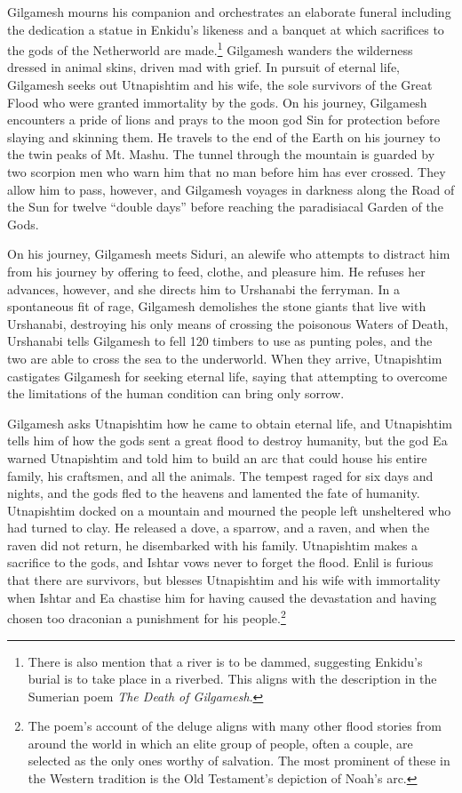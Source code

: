 \documentclass[10pt,a4paper]{article}
\begin{document}
Gilgamesh mourns his companion and orchestrates an elaborate funeral including the dedication a statue in Enkidu’s likeness and a banquet at which sacrifices to the gods of the Netherworld are made.\footnote{There is also mention that a river is to be dammed, suggesting Enkidu’s burial is to take place in a riverbed. This aligns with the description in the Sumerian poem \emph{The Death of Gilgamesh}.} Gilgamesh wanders the wilderness dressed in animal skins, driven mad with grief. In pursuit of eternal life, Gilgamesh seeks out Utnapishtim and his wife, the sole survivors of the Great Flood who were granted immortality by the gods. On his journey, Gilgamesh encounters a pride of lions and prays to the moon god Sin for protection before slaying and skinning them. He travels to the end of the Earth on his journey to the twin peaks of Mt. Mashu. The tunnel through the mountain is guarded by two scorpion men who warn him that no man before him has ever crossed. They allow him to pass, however, and Gilgamesh voyages in darkness along the Road of the Sun for twelve “double days” before reaching the paradisiacal Garden of the Gods. 

On his journey,  Gilgamesh meets Siduri, an alewife who attempts to distract him from his journey by offering to feed, clothe, and pleasure him. He refuses her advances, however, and she directs him to Urshanabi the ferryman. In a spontaneous fit of rage, Gilgamesh demolishes the stone giants that live with Urshanabi, destroying his only means of crossing the poisonous Waters of Death, Urshanabi tells Gilgamesh to fell 120 timbers to use as punting poles, and the two are able to cross the sea to the underworld. When they arrive, Utnapishtim castigates Gilgamesh for seeking eternal life, saying that attempting to overcome the limitations of the human condition can bring only sorrow. 

Gilgamesh asks Utnapishtim how he came to obtain eternal life, and Utnapishtim tells him of how the gods sent a great flood to destroy humanity, but the god Ea warned Utnapishtim and told him to build an arc that could house his entire family, his craftsmen, and all the animals. The tempest raged for six days and nights, and the gods fled to the heavens and lamented the fate of humanity. Utnapishtim docked on a mountain and mourned the people left unsheltered who had turned to clay. He released a dove, a sparrow, and a raven, and when the raven did not return, he disembarked with his family. Utnapishtim makes a sacrifice to the gods, and Ishtar vows never to forget the flood. Enlil is furious that there are survivors, but blesses Utnapishtim and his wife with immortality when Ishtar and Ea chastise him for having caused the devastation and having chosen too draconian a punishment for his people.\footnote{The poem’s account of the deluge aligns with many other flood stories from around the world in which an elite group of people, often a couple, are selected as the only ones worthy of salvation. The most prominent of these in the Western tradition is the Old Testament’s depiction of Noah’s arc.}
\end{document}
